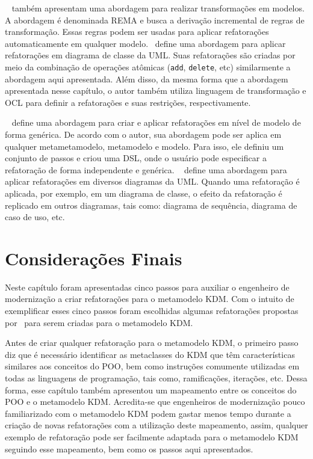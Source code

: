 ~ também apresentam uma abordagem para realizar transformações em modelos. A abordagem é denominada REMA e busca a derivação incremental de regras de transformação. Essas regras podem ser usadas para aplicar refatorações automaticamente em qualquer modelo.~ define uma abordagem para aplicar refatorações em diagrama de classe da UML. Suas refatorações são criadas por meio da combinação de operações atômicas (\texttt{add}, \texttt{delete}, etc) similarmente a abordagem aqui apresentada. Além disso, da mesma forma que a abordagem apresentada nesse capítulo, o autor também utiliza linguagem de transformação e OCL para definir a refatorações e suas restrições, respectivamente. 

~ define uma abordagem para criar e aplicar refatorações em nível de modelo de forma genérica. De acordo com o autor, sua abordagem pode ser aplica em qualquer metametamodelo, metamodelo e modelo. Para isso, ele definiu um conjunto de passos e criou uma DSL, onde o usuário pode especificar a refatoração de forma independente e genérica. ~ define uma abordagem para aplicar refatorações em diversos diagramas da UML. Quando uma refatoração é aplicada, por exemplo, em um diagrama de classe, o efeito da refatoração é replicado em outros diagramas, tais como: diagrama de sequência, diagrama de caso de uso, etc.

	
\section{Considerações Finais}\label{sec:consideracoes_finais_capitulo_reforacao}

Neste capítulo foram apresentadas cinco passos para auxiliar o engenheiro de modernização a criar refatorações para o metamodelo KDM. Com o intuito de exemplificar esses cinco passos foram escolhidas algumas refatorações propostas por~ para serem criadas para o metamodelo KDM. %

Antes de criar qualquer refatoração para o metamodelo KDM, o primeiro passo diz que é  necessário identificar as metaclasses do KDM que têm características similares aos conceitos do POO, bem como instruções comumente utilizadas em todas as linguagens de programação, tais como, ramificações, iterações, etc. Dessa forma, esse capítulo também apresentou um mapeamento entre os conceitos do POO e o metamodelo KDM. Acredita-se que engenheiros de modernização pouco familiarizado com o metamodelo KDM podem gastar menos tempo durante a criação de novas refatorações com a utilização deste mapeamento, assim, qualquer exemplo de refatoração pode ser facilmente adaptada para o metamodelo KDM seguindo esse mapeamento, bem como os passos aqui apresentados.

